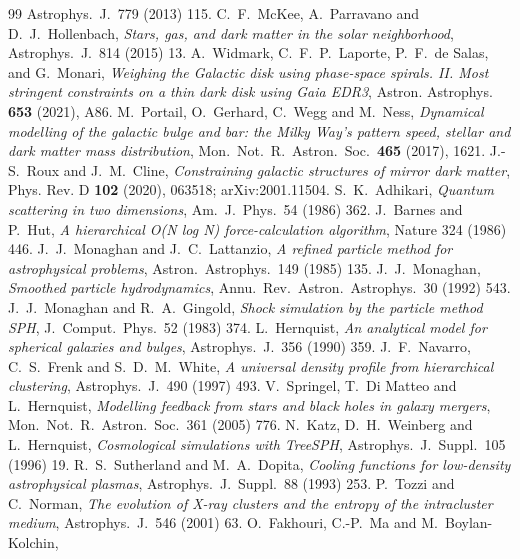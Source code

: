 \documentclass[11pt]{article}
\theoremstyle{definition}
\theoremstyle{plain}
\begin{document}
\begin{thebibliography}{99}
Astrophys.\ J.\ 779 (2013) 115.
 C.~F.~McKee, A.~Parravano and D.~J.~Hollenbach,
\emph{Stars, gas, and dark matter in the solar neighborhood},
Astrophys.\ J.\ 814 (2015) 13.
 A.~Widmark, C.~F.~P.~Laporte, P.~F.~de Salas, and G.~Monari,
\emph{Weighing the Galactic disk using phase-space spirals. II. Most stringent constraints on a thin dark disk using Gaia EDR3},
Astron. Astrophys. \textbf{653} (2021), A86.
 M.~Portail, O.~Gerhard, C.~Wegg and M.~Ness,
\emph{Dynamical modelling of the galactic bulge and bar: the Milky Way's pattern speed, stellar and dark matter mass distribution},
Mon.\ Not.\ R.\ Astron.\ Soc.\ \textbf{465} (2017), 1621.
 J.-S.~Roux and J.~M.~Cline,
\emph{Constraining galactic structures of mirror dark matter},
Phys. Rev. D \textbf{102} (2020), 063518; arXiv:2001.11504.
 S.~K.~Adhikari,
\emph{Quantum scattering in two dimensions},
Am.\ J.\ Phys.\ 54 (1986) 362.
 J.~Barnes and P.~Hut,
\emph{A hierarchical O(N log N) force-calculation algorithm},
Nature 324 (1986) 446.
 J.~J.~Monaghan and J.~C.~Lattanzio,
\emph{A refined particle method for astrophysical problems},
Astron.\ Astrophys.\ 149 (1985) 135.
 J.~J.~Monaghan,
\emph{Smoothed particle hydrodynamics},
Annu.\ Rev.\ Astron.\ Astrophys.\ 30 (1992) 543.
 J.~J.~Monaghan and R.~A.~Gingold,
\emph{Shock simulation by the particle method SPH},
J.\ Comput.\ Phys.\ 52 (1983) 374.
 L.~Hernquist,
\emph{An analytical model for spherical galaxies and bulges},
Astrophys.\ J.\ 356 (1990) 359.
 J.~F.~Navarro, C.~S.~Frenk and S.~D.~M.~White,
\emph{A universal density profile from hierarchical clustering},
Astrophys.\ J.\ 490 (1997) 493.
 V.~Springel, T.~Di Matteo and L.~Hernquist,
\emph{Modelling feedback from stars and black holes in galaxy mergers},
Mon.\ Not.\ R.\ Astron.\ Soc.\ 361 (2005) 776.
 N.~Katz, D.~H.~Weinberg and L.~Hernquist,
\emph{Cosmological simulations with TreeSPH},
Astrophys.\ J.\ Suppl.\ 105 (1996) 19.
 R.~S.~Sutherland and M.~A.~Dopita,
\emph{Cooling functions for low-density astrophysical plasmas},
Astrophys.\ J.\ Suppl.\ 88 (1993) 253.
 P.~Tozzi and C.~Norman,
\emph{The evolution of X-ray clusters and the entropy of the intracluster medium},
Astrophys.\ J.\ 546 (2001) 63.
 O.~Fakhouri, C.-P.~Ma and M.~Boylan-Kolchin,

\end{thebibliography}
\end{document}
